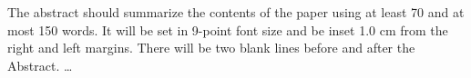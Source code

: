 The abstract should summarize the contents of the paper
using at least 70 and at most 150 words. It will be set in 9-point
font size and be inset 1.0 cm from the right and left margins.
There will be two blank lines before and after the Abstract. \dots
